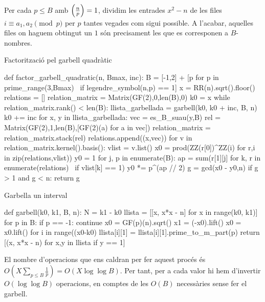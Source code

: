 Per cada $p\leq B$ amb $\left(\frac{n}{p}\right)=1$, dividim les entrades $x^2-n$ de les files $i\equiv a_1,a_2\pmod{p}$ per $p$ tantes vegades com sigui possible. A l'acabar, aquelles files on haguem obtingut un $1$ són precisament les que es corresponen a $B$-nombres.


\begin{algo}
\caption{Factorització pel garbell quadràtic}
\begin{python}
def factor_garbell_quadratic(n, Bmax, inc):
    B = [-1,2] + [p for p in prime_range(3,Bmax) \
                    if legendre_symbol(n,p) == 1]
    x = RR(n).sqrt().floor()
    relations = []
    relation_matrix = Matrix(GF(2),0,len(B),0)
    k0 = x
    while relation_matrix.rank() < len(B):
        llista_garbellada = garbell(k0, k0 + inc, B, n)
        k0 += inc
        for x, y in llista_garbellada:
            vec = es_B_suau(y,B)
            rel = Matrix(GF(2),1,len(B),[GF(2)(a) for a in vec])
            relation_matrix = relation_matrix.stack(rel)
            relations.append((x,vec))
        for v in relation_matrix.kernel().basis():
            vlist = v.list()
            x0 = prod(ZZ(r[0])^ZZ(i) for r,i in zip(relations,vlist))
            y0 = 1
            for j, p in enumerate(B):
                ap = sum(r[1][j] for k, r in enumerate(relations) \
                                 if vlist[k] == 1)
                y0 *= p^(ap // 2)
            g = gcd(x0 - y0,n)
            if g > 1 and g < n:
                return g
\end{python}
\end{algo}

\begin{algo}
\caption{Garbella un interval}
\begin{python}
def garbell(k0, k1, B, n):
    N = k1 - k0
    llista = [[x, x*x - n] for x in range(k0, k1)]
    for p in B:
        if p == -1: continue
        x0 = GF(p)(n).sqrt()
        x1 = (-x0).lift()
        x0 = x0.lift()
        for i in range((x0-k0) %
            llista[i][1] = llista[i][1].prime_to_m_part(p)
    return [(x, x*x - n) for x,y in llista if y == 1]
\end{python}
\end{algo}


El nombre d'operacions que ens caldran per fer aquest procés és $O(X\sum_{p\leq B} \frac 1p )= O(X\log\log B)$. Per tant, per a cada valor hi hem d'invertir $O(\log\log B)$ operacions, en comptes de les $O(B)$ necessàries sense fer el garbell.

